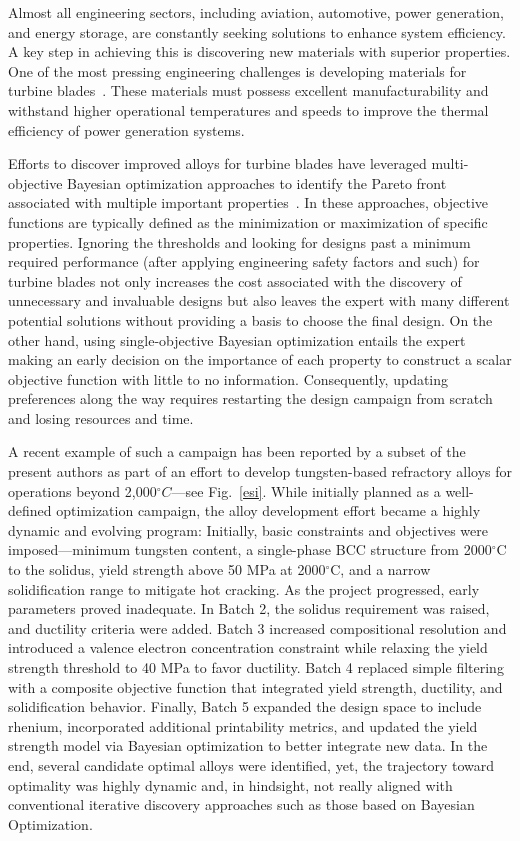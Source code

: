 \documentclass[final,5p,times,twocolumn]{elsarticle}
\begin{document}
Almost all engineering sectors, including aviation, automotive, power generation, and energy storage, are constantly seeking solutions to enhance system efficiency. A key step in achieving this is discovering new materials with superior properties. One of the most pressing engineering challenges is developing materials for turbine blades~\cite{arpa-e_2020}. These materials must possess excellent manufacturability and withstand higher operational temperatures and speeds to improve the thermal efficiency of power generation systems.

Efforts to discover improved alloys for turbine blades have leveraged multi-objective Bayesian optimization approaches to identify the Pareto front associated with multiple important properties~\cite{khatamsaz2022multi,khatamsaz2023bayesian}. In these approaches, objective functions are typically defined as the minimization or maximization of specific properties. Ignoring the thresholds and looking for designs past a minimum required performance (after applying engineering safety factors and such) for turbine blades not only increases the cost associated with the discovery of unnecessary and invaluable designs but also leaves the expert with many different potential solutions without providing a basis to choose the final design. On the other hand, using single-objective Bayesian optimization entails the expert making an early decision on the importance of each property to construct a scalar objective function with little to no information. Consequently, updating preferences along the way requires restarting the design campaign from scratch and losing resources and time.

A recent example of such a campaign has been reported by a subset of the present authors\cite{acemi2024multi} as part of an effort to develop tungsten-based refractory alloys for operations beyond 2,000$^{\circ}C$---see Fig.~\ref{esi}. While initially planned as a well-defined optimization campaign, the alloy development effort became a highly dynamic and evolving program: Initially, basic constraints and objectives were imposed---minimum tungsten content, a single-phase BCC structure from 2000$^{\circ}$C to the solidus, yield strength above 50 MPa at 2000$^{\circ}$C, and a narrow solidification range to mitigate hot cracking. As the project progressed, early parameters proved inadequate. In Batch 2, the solidus requirement was raised, and ductility criteria were added. Batch 3 increased compositional resolution and introduced a valence electron concentration constraint while relaxing the yield strength threshold to 40 MPa to favor ductility. Batch 4 replaced simple filtering with a composite objective function that integrated yield strength, ductility, and solidification behavior. Finally, Batch 5 expanded the design space to include rhenium, incorporated additional printability metrics, and updated the yield strength model via Bayesian optimization to better integrate new data. In the end, several candidate optimal alloys were identified, yet, the trajectory toward optimality was highly dynamic and, in hindsight, not really aligned with conventional iterative discovery approaches such as those based on Bayesian Optimization\cite{arroyave2022perspective}.
\end{document}
